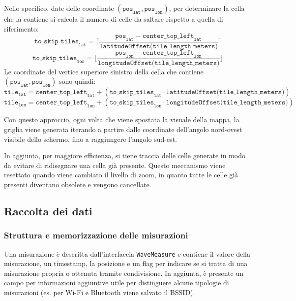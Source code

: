 \documentclass[11pt]{article}
\begin{document}
Nello specifico, date delle coordinate $(\texttt{pos}_{\texttt{lat}}, \texttt{pos}_{\texttt{lon}})$, per determinare la cella che la contiene si calcola il numero di celle da saltare rispetto a quella di riferimento: 
\begin{equation*}
    \texttt{to\_skip\_tiles}_\texttt{lat} =
        \lceil \frac{\texttt{pos}_{\texttt{lat}} - \texttt{center\_top\_left}_{\texttt{lat}}}{\texttt{latitudeOffset(tile\_length\_meters)}} \rceil
\end{equation*}
\begin{equation*}
    \texttt{to\_skip\_tiles}_\texttt{lon} =
        \lfloor \frac{\texttt{pos}_{\texttt{lon}} - \texttt{center\_top\_left}_{\texttt{lon}}}{\texttt{longitudeOffset(tile\_length\_meters)}} \rfloor
\end{equation*}
Le coordinate del vertice superiore sinistro della cella che contiene $(\texttt{pos}_{\texttt{lat}}, \texttt{pos}_{\texttt{lon}})$ sono quindi:
\begin{equation*}
    \texttt{tile}_\texttt{lat} = \texttt{center\_top\_left}_{\texttt{lat}} + (\texttt{to\_skip\_tiles}_\texttt{lat} \cdot \texttt{latitudeOffset(tile\_length\_meters)})
\end{equation*}
\begin{equation*}
    \texttt{tile}_\texttt{lon} = \texttt{center\_top\_left}_{\texttt{lon}} + (\texttt{to\_skip\_tiles}_\texttt{lon} \cdot \texttt{longitudeOffset(tile\_length\_meters)})
\end{equation*}

Con questo approccio, ogni volta che viene spostata la visuale della mappa, la griglia viene generata iterando a partire dalle coordinate dell'angolo nord-ovest visibile dello schermo, fino a raggiungere l'angolo sud-est. 

In aggiunta, per maggiore efficienza, si tiene traccia delle celle generate in modo da evitare di ridisegnare una cella già presente. Questo meccanismo viene resettato quando viene cambiato il livello di zoom, in quanto tutte le celle già presenti diventano obsolete e vengono cancellate.



\subsection{Raccolta dei dati}

\subsubsection{Struttura e memorizzazione delle misurazioni}
Una misurazione è descritta dall'interfaccia \texttt{WaveMeasure} e contiene il valore della misurazione, un timestamp, la posizione e un flag per indicare se si tratta di una misurazione propria o ottenuta tramite condivisione. 
In aggiunta, è presente un campo per informazioni aggiuntive utile per distinguere alcune tipologie di misurazioni (es. per Wi-Fi e Bluetooth viene salvato il BSSID).
\end{document}
